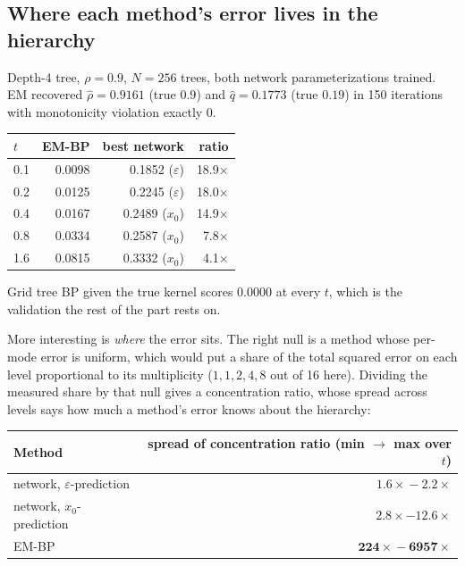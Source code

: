 \documentclass[11pt]{article}
\theoremstyle{remark}
\begin{document}
\subsection{Where each method's error lives in the hierarchy}
\label{sec:levels}

Depth-4 tree, $\rho = 0.9$, $N = 256$ trees, both network parameterizations
trained. EM recovered $\hat\rho = 0.9161$ (true $0.9$) and $\hat q = 0.1773$
(true $0.19$) in 150 iterations with monotonicity violation exactly 0.

\begin{center}
\begin{tabular}{@{}lrrr@{}}
\toprule
$t$ & EM-BP & best network & ratio \\
\midrule
0.1 & 0.0098 & 0.1852 ($\varepsilon$) & 18.9$\times$ \\
0.2 & 0.0125 & 0.2245 ($\varepsilon$) & 18.0$\times$ \\
0.4 & 0.0167 & 0.2489 ($x_0$) & 14.9$\times$ \\
0.8 & 0.0334 & 0.2587 ($x_0$) & 7.8$\times$ \\
1.6 & 0.0815 & 0.3332 ($x_0$) & 4.1$\times$ \\
\bottomrule
\end{tabular}
\end{center}

Grid tree BP given the true kernel scores $0.0000$ at every $t$, which is the
validation the rest of the part rests on.

More interesting is \emph{where} the error sits. The right null is a method
whose per-mode error is uniform, which would put a share of the total squared
error on each level proportional to its multiplicity ($1,1,2,4,8$ out of 16
here). Dividing the measured share by that null gives a concentration ratio,
whose spread across levels says how much a method's error knows about the
hierarchy:

\begin{center}
\begin{tabular}{@{}lr@{}}
\toprule
Method & spread of concentration ratio (min $\to$ max over $t$) \\
\midrule
network, $\varepsilon$-prediction & $\mathbf{1.6\times} - \mathbf{2.2\times}$ \\
network, $x_0$-prediction & $2.8\times - 12.6\times$ \\
EM-BP & $\mathbf{224\times} - \mathbf{6957\times}$ \\
\bottomrule
\end{tabular}
\end{center}
\end{document}
